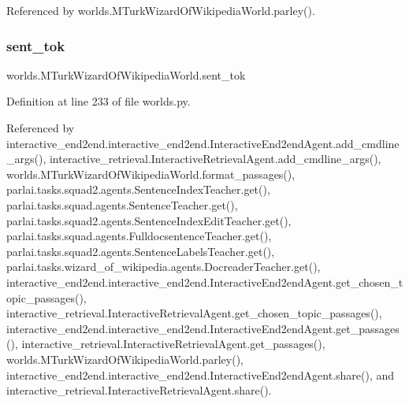 Referenced by worlds.\+M\+Turk\+Wizard\+Of\+Wikipedia\+World.\+parley().

\mbox{\label{classworlds_1_1MTurkWizardOfWikipediaWorld_a9dcd28ef1322d765f074004f05bf4e33}} 
\subsubsection{\texorpdfstring{sent\+\_\+tok}{sent\_tok}}
{\footnotesize\ttfamily worlds.\+M\+Turk\+Wizard\+Of\+Wikipedia\+World.\+sent\+\_\+tok}



Definition at line 233 of file worlds.\+py.



Referenced by interactive\+\_\+end2end.\+interactive\+\_\+end2end.\+Interactive\+End2end\+Agent.\+add\+\_\+cmdline\+\_\+args(), interactive\+\_\+retrieval.\+Interactive\+Retrieval\+Agent.\+add\+\_\+cmdline\+\_\+args(), worlds.\+M\+Turk\+Wizard\+Of\+Wikipedia\+World.\+format\+\_\+passages(), parlai.\+tasks.\+squad2.\+agents.\+Sentence\+Index\+Teacher.\+get(), parlai.\+tasks.\+squad.\+agents.\+Sentence\+Teacher.\+get(), parlai.\+tasks.\+squad2.\+agents.\+Sentence\+Index\+Edit\+Teacher.\+get(), parlai.\+tasks.\+squad.\+agents.\+Fulldocsentence\+Teacher.\+get(), parlai.\+tasks.\+squad2.\+agents.\+Sentence\+Labels\+Teacher.\+get(), parlai.\+tasks.\+wizard\+\_\+of\+\_\+wikipedia.\+agents.\+Docreader\+Teacher.\+get(), interactive\+\_\+end2end.\+interactive\+\_\+end2end.\+Interactive\+End2end\+Agent.\+get\+\_\+chosen\+\_\+topic\+\_\+passages(), interactive\+\_\+retrieval.\+Interactive\+Retrieval\+Agent.\+get\+\_\+chosen\+\_\+topic\+\_\+passages(), interactive\+\_\+end2end.\+interactive\+\_\+end2end.\+Interactive\+End2end\+Agent.\+get\+\_\+passages(), interactive\+\_\+retrieval.\+Interactive\+Retrieval\+Agent.\+get\+\_\+passages(), worlds.\+M\+Turk\+Wizard\+Of\+Wikipedia\+World.\+parley(), interactive\+\_\+end2end.\+interactive\+\_\+end2end.\+Interactive\+End2end\+Agent.\+share(), and interactive\+\_\+retrieval.\+Interactive\+Retrieval\+Agent.\+share().

\mbox{\label{classworlds_1_1MTurkWizardOfWikipediaWorld_ac55cb6fd6e8840148b7c70edfa015583}} 
